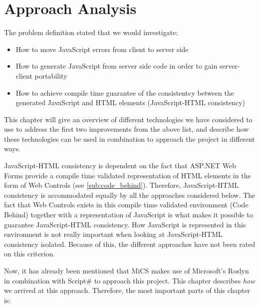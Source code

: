 \chapter{Approach Analysis}
	The problem definition stated that we would investigate:

	\begin{itemize}
		\item How to move JavaScript errors from client to server side
		\item How to generate JavaScript from server side code in order to gain server-client portability
		\item How to achieve compile time guarantee of the consistentcy between the generated JavaScript and HTML elements (JavaScript-HTML consistency)
	\end{itemize}

	This chapter will give an overview of different technologies we have considered to use to address the first two improvements from the above list, and describe how these technologies can be used in combination to approach the project in different ways.

	JavaScript-HTML consistency is dependent on the fact that ASP.NET Web Forms provide a compile time validated representation of HTML elements in the form of Web Controls (see \ref{sub:code_behind}). Therefore, JavaScript-HTML consistency is accommodated equally by all the approaches considered below. The fact that Web Controls exists in this compile time validated environment (Code Behind) together with a representation of JavaScript is what makes it possible to guarantee JavaScript-HTML consistency. How JavaScript is represented in this environment is not really important when looking at JavaScript-HTML consistency isolated. Because of this, the different approaches have not been rated on this criterion.

	Now, it has already been mentioned that MiCS makes use of Microsoft's Roslyn in combination with Script\# to approach this project. This chapter describes \emph{how} we arrived at this approach. Therefore, the most important parts of this chapter is:

